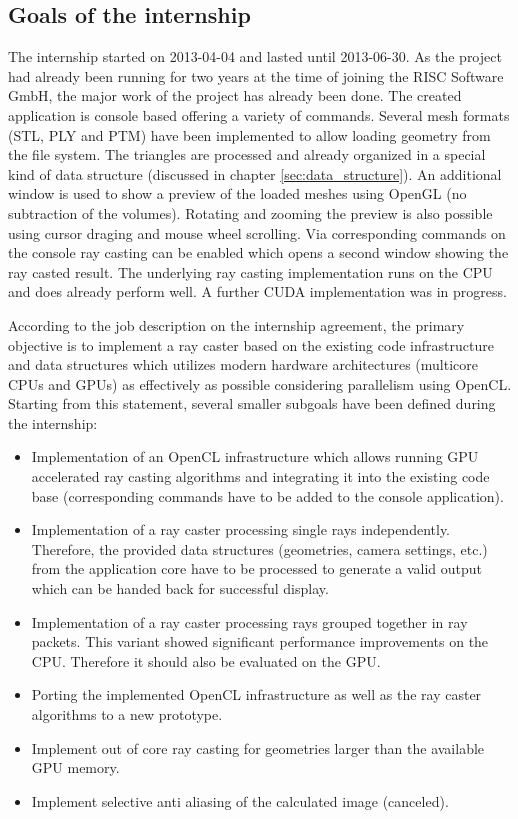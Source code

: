 \subsection{Goals of the internship}

The internship started on 2013-04-04 and lasted until 2013-06-30. As the project had already been running for two years at the time of joining the RISC Software GmbH, the major work of the project has already been done. The created application is console based offering a variety of commands. Several mesh formats (STL, PLY and PTM) have been implemented to allow loading geometry from the file system. The triangles are processed and already organized in a special kind of data structure (discussed in chapter \ref{sec:data_structure}). An additional window is used to show a preview of the loaded meshes using OpenGL (no subtraction of the volumes). Rotating and zooming the preview is also possible using cursor draging and mouse wheel scrolling. Via corresponding commands on the console ray casting can be enabled which opens a second window showing the ray casted result. The underlying ray casting implementation runs on the CPU and does already perform well. A further CUDA implementation was in progress.

According to the job description on the internship agreement, the primary objective is to implement a ray caster based on the existing code infrastructure and data structures which utilizes modern hardware architectures (multicore CPUs and GPUs) as effectively as possible considering parallelism using OpenCL. Starting from this statement, several smaller subgoals have been defined during the internship:

\begin{itemize}
	\item Implementation of an OpenCL infrastructure which allows running GPU accelerated ray casting algorithms and integrating it into the existing code base (corresponding commands have to be added to the console application).
	\item Implementation of a ray caster processing single rays independently. Therefore, the provided data structures (geometries, camera settings, etc.) from the application core have to be processed to generate a valid output which can be handed back for successful display.
	\item Implementation of a ray caster processing rays grouped together in ray packets. This variant showed significant performance improvements on the CPU. Therefore it should also be evaluated on the GPU.
	\item Porting the implemented OpenCL infrastructure as well as the ray caster algorithms to a new prototype.
	\item Implement out of core ray casting for geometries larger than the available GPU memory.
	\item Implement selective anti aliasing of the calculated image (canceled).
\end{itemize}


